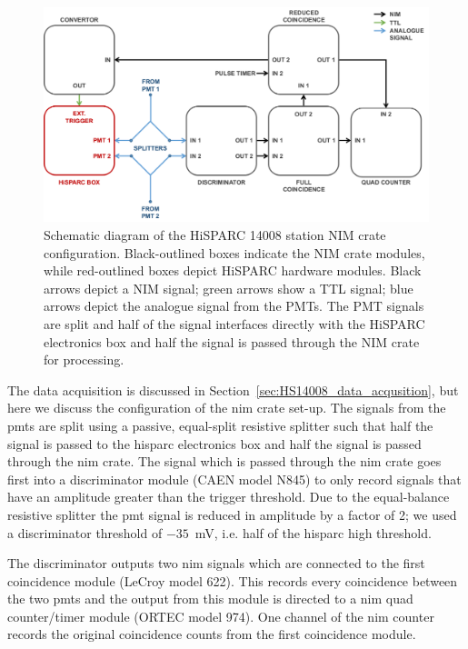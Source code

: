 \begin{figure}[ht!]
	\centering
	\includegraphics[width=\columnwidth]{14008_nim_config.png}
	\caption{Schematic diagram of the HiSPARC 14008 station NIM crate configuration. Black-outlined boxes indicate the NIM crate modules, while red-outlined boxes depict HiSPARC hardware modules. Black arrows depict a NIM signal; green arrows show a TTL signal; blue arrows depict the analogue signal from the PMTs. The PMT signals are split and half of the signal interfaces directly with the HiSPARC electronics box and half the signal is passed through the NIM crate for processing.}
	\label{fig:14008_NIM}
\end{figure}

The data acquisition is discussed in Section~\ref{sec:HS14008_data_acqusition}, but here we discuss the configuration of the \gls{nim} crate set-up. The signals from the \glspl{pmt} are split using a passive, equal-split resistive splitter such that half the signal is passed to the \gls{hisparc} electronics box and half the signal is passed through the \gls{nim} crate. The signal which is passed through the \gls{nim} crate goes first into a discriminator module (CAEN model N845) to only record signals that have an amplitude greater than the trigger threshold. Due to the equal-balance resistive splitter the \gls{pmt} signal is reduced in amplitude by a factor of 2; we used a discriminator threshold of $-35$~mV, i.e. half of the \gls{hisparc} high threshold.

The discriminator outputs two \gls{nim} signals which are connected to the first coincidence module (LeCroy model 622). This records every coincidence between the two \glspl{pmt} and the output from this module is directed to a \gls{nim} quad counter/timer module (ORTEC model 974). One channel of the \gls{nim} counter records the original coincidence counts from the first coincidence module.

